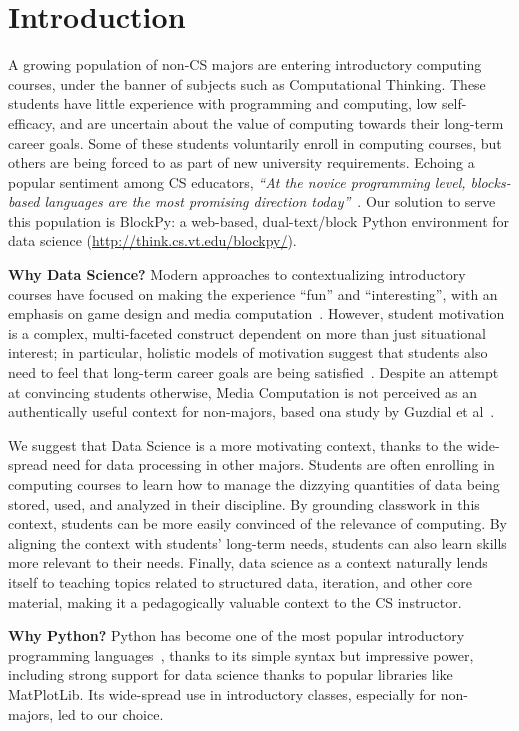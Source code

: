\documentclass{sig-alternate}
\begin{document}
\section{Introduction}

A growing population of non-CS majors are entering introductory computing courses, under the banner of subjects such as Computational Thinking.
These students have little experience with programming and computing, low self-efficacy, and are uncertain about the value of computing towards their long-term career goals.
Some of these students voluntarily enroll in computing courses, but others are being forced to as part of new university requirements.
Echoing a popular sentiment among CS educators, 
\textit{``At the novice programming level, blocks-based languages are the most promising direction today''}~\cite{guzdial-blocks}.
Our solution to serve this population is BlockPy: a web-based, dual-text/block Python environment for data science (\url{http://think.cs.vt.edu/blockpy/}).

\textbf{Why Data Science?}
Modern approaches to contextualizing introductory courses have focused on making the experience ``fun'' and ``interesting'', with an emphasis on game design and media computation~\cite{systematic-review}.
However, student motivation is a complex, multi-faceted construct dependent on more than just situational interest; in particular, holistic models of motivation suggest that students also need to feel that long-term career goals are being satisfied~\cite{jones-description}.
Despite an attempt at convincing students otherwise, Media Computation is not perceived as an authentically useful context for non-majors, based ona  study by Guzdial et al~\cite{guzdial2006imagineering}.

We suggest that Data Science is a more motivating context, thanks to the wide-spread need for data processing in other majors.
Students are often enrolling in computing courses to learn how to manage the dizzying quantities of data being stored, used, and analyzed in their discipline.
By grounding classwork in this context, students can be more easily convinced of the relevance of computing.
By aligning the context with students' long-term needs, students can also learn skills more relevant to their needs.
Finally, data science as a context naturally lends itself to teaching topics related to structured data, iteration, and other core material, making it a pedagogically valuable context to the CS instructor.

\textbf{Why Python?}
Python has become one of the most popular introductory programming languages~\cite{guo2014python}, thanks to its simple syntax but impressive power, including strong support for data science thanks to popular libraries like MatPlotLib.
Its wide-spread use in introductory classes, especially for non-majors, led to our choice.
\end{document}
